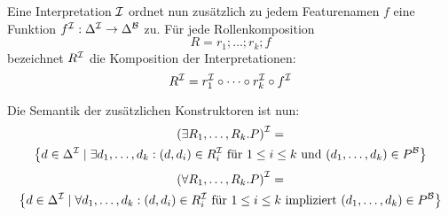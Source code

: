 \begin{definition}
Eine Interpretation $\mathcal{I}$ ordnet nun zusätzlich zu jedem Featurenamen
$f$ eine Funktion $f^{\mathcal{I}}:\Delta^{\mathcal{I}} \rightarrow \Delta^{\mathcal{B}}$ zu. Für
jede Rollenkomposition $$R = r_1;\ldots;r_k;f$$ bezeichnet $R^{\mathcal{I}}$
die Komposition der Interpretationen:
$$R^{\mathcal{I}} = r_1^{\mathcal{I}} \circ \cdots \circ r_k^{\mathcal{I}} \circ f^{\mathcal{I}}$$

Die Semantik der zusätzlichen Konstruktoren ist nun:
    \begin{multline*}
        {( \exists R_1,\ldots, R_k.P )}^\MI =\\
    \left\{ d \in \Delta^\MI \mid \exists d_1,\ldots,d_k: ( d,d_i) \in R_i^\MI\ \text{für}\ 1 \leq i \leq k\ \text{und}\ ( d_1, \ldots, d_k ) \in P^\MB \right\}
    \end{multline*}
    \begin{multline*}
    {( \forall R_1,\ldots, R_k.P )}^\MI =\\
                  \left\{ d \in \Delta^\MI \mid \forall d_1,\ldots,d_k:( d,d_i) \in R_i^\MI\ \text{für}\ 1 \leq i \leq k\ \text{impliziert}\ (d_1, \ldots, d_k) \in P^\MB \right\}
\end{multline*}
\end{definition}

